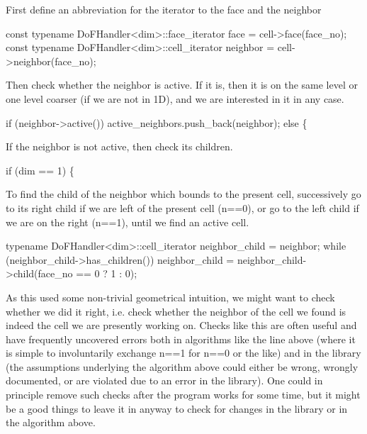 First define an abbreviation for the iterator to the face and the neighbor


\begin{DoxyCode}
\textcolor{keyword}{const} \textcolor{keyword}{typename} DoFHandler<dim>::face\_iterator face =
    cell->face(face\_no);
\textcolor{keyword}{const} \textcolor{keyword}{typename} DoFHandler<dim>::cell\_iterator neighbor =
    cell->neighbor(face\_no);
\end{DoxyCode}


Then check whether the neighbor is active. If it is, then it is on the same level or one level coarser (if we are not in 1D), and we are interested in it in any case.


\begin{DoxyCode}
\textcolor{keywordflow}{if} (neighbor->active())
    active\_neighbors.push\_back(neighbor);
\textcolor{keywordflow}{else} \{
\end{DoxyCode}


If the neighbor is not active, then check its children.


\begin{DoxyCode}
\textcolor{keywordflow}{if} (dim == 1) \{
\end{DoxyCode}


To find the child of the neighbor which bounds to the present cell, successively go to its right child if we are left of the present cell (n==0), or go to the left child if we are on the right (n==1), until we find an active cell.


\begin{DoxyCode}
\textcolor{keyword}{typename} DoFHandler<dim>::cell\_iterator neighbor\_child =
    neighbor;
\textcolor{keywordflow}{while} (neighbor\_child->has\_children())
    neighbor\_child =
        neighbor\_child->child(face\_no == 0 ? 1 : 0);
\end{DoxyCode}


As this used some non-\/trivial geometrical intuition, we might want to check whether we did it right, i.\+e. check whether the neighbor of the cell we found is indeed the cell we are presently working on. Checks like this are often useful and have frequently uncovered errors both in algorithms like the line above (where it is simple to involuntarily exchange {\ttfamily n==1} for {\ttfamily n==0} or the like) and in the library (the assumptions underlying the algorithm above could either be wrong, wrongly documented, or are violated due to an error in the library). One could in principle remove such checks after the program works for some time, but it might be a good things to leave it in anyway to check for changes in the library or in the algorithm above.

